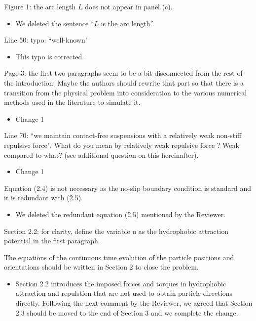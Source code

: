 \documentclass[11pt]{article}
\newcommand{\comment}[1]{{\color{blue} #1}}
\begin{document}
\noindent
\comment{Figure 1: the arc length $L$ does not appear in panel (c).}
\begin{itemize}
  \item We deleted the sentence ``$L$ is the arc length''.
\end{itemize}

\noindent
\comment{Line 50: typo: ``well-known"}
\begin{itemize}
  \item This typo is corrected.
\end{itemize}

\noindent
\comment{Page 3: the first two paragraphs seem to be a bit disconnected
from the rest of the introduction. Maybe the authors should rewrite that
part so that there is a transition from the physical problem into
consideration to the various numerical methods used in the literature to
simulate it.}
\begin{itemize}
  \item Change 1 
\end{itemize}

\noindent
\comment{Line 70: ``we maintain contact-free suspensions with a
relatively weak non-stiff repulsive force". What do you mean by
relatively weak repulsive force ? Weak compared to what? (see additional
question on this hereinafter).}
\begin{itemize}
  \item Change 1 
\end{itemize}

\noindent
\comment{Equation (2.4) is not necessary as the no-slip boundary
condition is standard and it is redundant with (2.5).}
\begin{itemize}
  \item We deleted the redundant equation (2.5) mentioned by the Reviewer.
\end{itemize}

\noindent
\comment{Section 2.2: for clarity, define the variable u as the
hydrophobic attraction potential in the first paragraph.}

\noindent
\comment{The equations of the continuous time evolution of the particle
positions and orientations should be written in Section 2 to close the
problem.}
\begin{itemize}
  \item Section 2.2 introduces the imposed forces and torques in hydrophobic attraction and repulstion that are not used to obtain particle directions directly. Following the next comment by 
the Reviewer, we agreed that Section 2.3 should be moved to the end of Section 3 and we complete the change.
\end{itemize}
\end{document}
